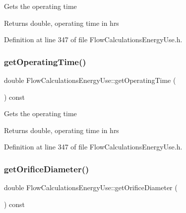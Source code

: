Gets the operating time

\begin{DoxyReturn}{Returns}
double, operating time in hrs 
\end{DoxyReturn}


Definition at line 347 of file Flow\+Calculations\+Energy\+Use.\+h.

\mbox{\label{class_flow_calculations_energy_use_ab44c6cad4825e30f5599f18fcbfbb873}} 
\subsubsection{\texorpdfstring{get\+Operating\+Time()}{getOperatingTime()}\hspace{0.1cm}{\footnotesize\ttfamily [3/3]}}
{\footnotesize\ttfamily double Flow\+Calculations\+Energy\+Use\+::get\+Operating\+Time (\begin{DoxyParamCaption}{ }\end{DoxyParamCaption}) const\hspace{0.3cm}{\ttfamily [inline]}}

Gets the operating time

\begin{DoxyReturn}{Returns}
double, operating time in hrs 
\end{DoxyReturn}


Definition at line 347 of file Flow\+Calculations\+Energy\+Use.\+h.

\mbox{\label{class_flow_calculations_energy_use_a71c34f09ec3524db321b8934930700c5}} 
\subsubsection{\texorpdfstring{get\+Orifice\+Diameter()}{getOrificeDiameter()}\hspace{0.1cm}{\footnotesize\ttfamily [1/3]}}
{\footnotesize\ttfamily double Flow\+Calculations\+Energy\+Use\+::get\+Orifice\+Diameter (\begin{DoxyParamCaption}{ }\end{DoxyParamCaption}) const\hspace{0.3cm}{\ttfamily [inline]}}

